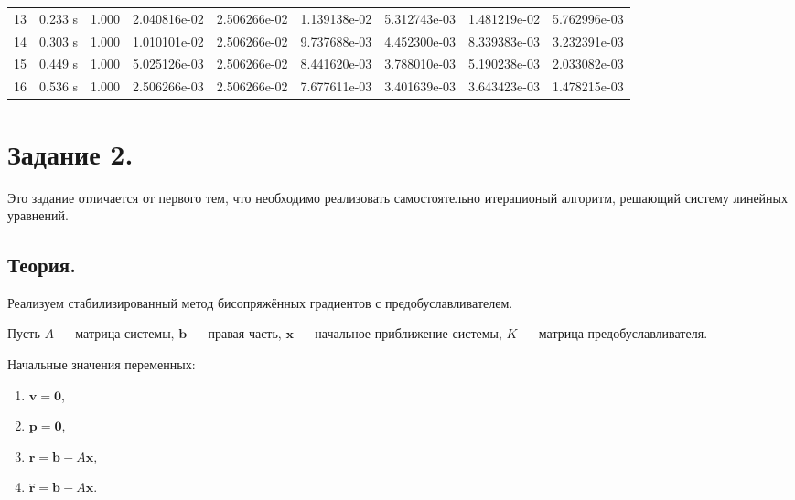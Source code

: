 \documentclass[12pt]{article}
\begin{document}
\begin{center}
\begin{tabular}{lllllllll}
13&      0.233 s&      1.000&      2.040816e-02&      2.506266e-02&      1.139138e-02&      5.312743e-03&      1.481219e-02&      5.762996e-03\\
14&      0.303 s&      1.000&      1.010101e-02&      2.506266e-02&      9.737688e-03&      4.452300e-03&      8.339383e-03&      3.232391e-03\\
15&      0.449 s&      1.000&      5.025126e-03&      2.506266e-02&      8.441620e-03&      3.788010e-03&      5.190238e-03&      2.033082e-03\\
16&      0.536 s&      1.000&      2.506266e-03&      2.506266e-02&      7.677611e-03&      3.401639e-03&      3.643423e-03&      1.478215e-03\\

\end{tabular}
\end{center}

\section{Задание 2.}

Это задание отличается от первого тем, что необходимо реализовать самостоятельно итерационый алгоритм, решающий систему линейных уравнений.

\subsection{Теория.}

Реализуем стабилизированный метод бисопряжённых
градиентов с предобуславливателем. 

Пусть $A$ --- матрица системы, $\mathbf b$ --- правая часть, $\mathbf x$ ---
начальное приближение системы, $K$ --- матрица предобуславливателя.

Начальные значения переменных:

\begin{enumerate}
\item $\mathbf v = \mathbf 0$,
\item $\mathbf p = \mathbf 0$,
\item $\mathbf r = \mathbf b - A \mathbf x$,
\item $\mathbf{\hat r} = \mathbf b - A \mathbf x$.
\end{enumerate}
\end{document}
